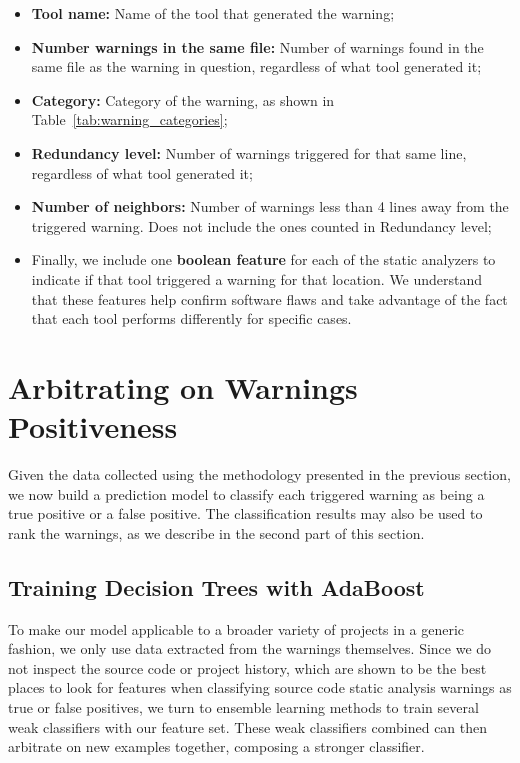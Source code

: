 \begin{itemize}
  \item \textbf{Tool name:} Name of the tool that generated the warning;
  \item \textbf{Number warnings in the same file:} Number of warnings found in the same file as the warning in question, regardless of what tool generated it;
  \item \textbf{Category:} Category of the warning, as shown in Table~\ref{tab:warning_categories};
  \item \textbf{Redundancy level:} Number of warnings triggered for that same line, regardless of what tool generated it;
  \item \textbf{Number of neighbors:} Number of warnings less than 4 lines away from the triggered warning. Does not include the ones counted in Redundancy level;
  \item Finally, we include one \textbf{boolean feature} for each of the static analyzers to indicate if that tool triggered a warning for that location. We understand that these features help confirm software flaws and take advantage of the fact that each tool performs differently for specific cases.
\end{itemize}


\section{Arbitrating on Warnings Positiveness}
\label{sec:positiveness}

Given the data collected using the methodology presented in the previous
section, we now build a prediction model to classify each triggered warning as
being a true positive or a false positive. The classification results may also be
used to rank the warnings, as we describe in the second part of this section.

\subsection{Training Decision Trees with AdaBoost}

To make our model applicable to a broader variety of projects in a generic
fashion, we only use data extracted from the warnings themselves. Since we do
not inspect the source code or project history, which are shown to be the best
places to look for features when classifying source code static analysis
warnings as true or false positives, we turn to ensemble learning methods to
train several weak classifiers with our feature set. These weak classifiers
combined can then arbitrate on new examples together, composing a stronger
classifier.


